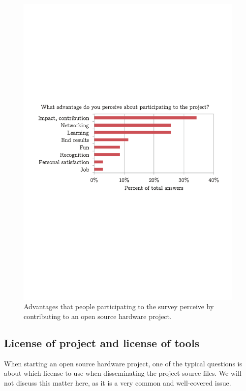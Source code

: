 \documentclass[letterpaper, 10 pt, conference]{ieeeconf}  %
\begin{document}
\begin{figure}
\centering
\includegraphics[width=\columnwidth]{figures/advantages}
\caption{Advantages that people participating to the survey perceive by contributing to an open source hardware project.}
\label{fig:getout}
\end{figure}

\subsection{License of project and license of tools}

When starting an open source hardware project, one of the typical questions is about which license to use when disseminating the project source files. 
We will not discuss this matter here, as it is a very common and well-covered issue. 
\end{document}
